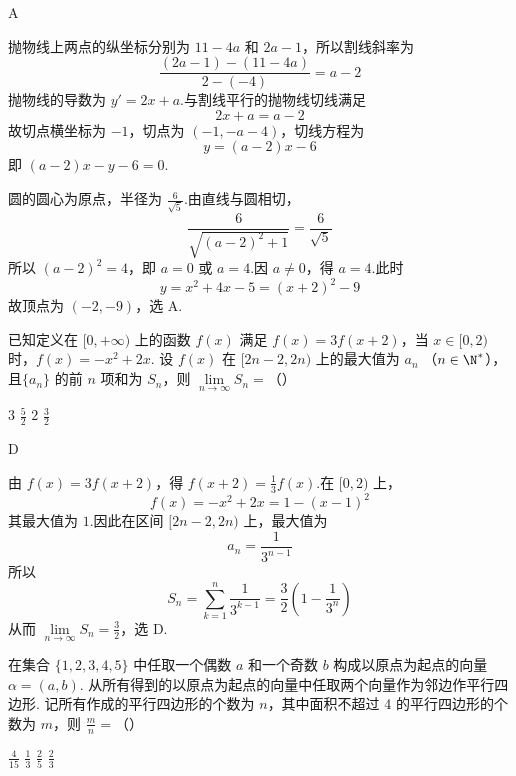 \begin{answer}
A
\end{answer}

\begin{solution}
抛物线上两点的纵坐标分别为 \(11-4a\) 和 \(2a-1\)，所以割线斜率为
\[
\frac{(2a-1)-(11-4a)}{2-(-4)}=a-2
\]
抛物线的导数为 \(y'=2x+a\).与割线平行的抛物线切线满足
\[
2x+a=a-2
\]
故切点横坐标为 \(-1\)，切点为 \((-1,-a-4)\)，切线方程为
\[
y=(a-2)x-6
\]
即 \((a-2)x-y-6=0\).

圆的圆心为原点，半径为 \(\frac{6}{\sqrt5}\).由直线与圆相切，
\[
\frac{6}{\sqrt{(a-2)^2+1}}=\frac{6}{\sqrt5}
\]
所以 \((a-2)^2=4\)，即 \(a=0\) 或 \(a=4\).因 \(a\neq0\)，得 \(a=4\).此时
\[
y=x^2+4x-5=(x+2)^2-9
\]
故顶点为 \((-2,-9)\)，选 A.
\end{solution}

\begin{problem}
已知定义在 \( [0, +\infty) \) 上的函数 \( f(x) \) 满足 \( f(x) = 3f(x + 2) \)，当 \( x \in [0, 2) \) 时，\( f(x) = -x^{2} + 2x \). 设 \( f(x) \) 在 \( [2n - 2, 2n) \) 上的最大值为 \( a_{n} \) （\( n \in \N^{*} \)），且\(\{a_{n}\}\) 的前 \(n\) 项和为 \(S_{n}\)，则 \(\lim\limits_{n\to\infty} S_{n} =\)（\quad）

\choices
    {\(3\)}
    {\(\frac{5}{2}\)}
    {\(2\)}
    {\(\frac{3}{2}\)}
\end{problem}

\begin{answer}
D
\end{answer}

\begin{solution}
由 \(f(x)=3f(x+2)\)，得 \(f(x+2)=\frac13f(x)\).在 \([0,2)\) 上，
\[
f(x)=-x^2+2x=1-(x-1)^2
\]
其最大值为 \(1\).因此在区间 \([2n-2,2n)\) 上，最大值为
\[
a_n=\frac{1}{3^{n-1}}
\]
所以
\[
S_n=\sum_{k=1}^{n}\frac{1}{3^{k-1}}=\frac{3}{2}\left(1-\frac{1}{3^n}\right)
\]
从而 \(\lim\limits_{n\to\infty}S_n=\frac32\)，选 D.
\end{solution}

\begin{problem}
在集合 \(\{1, 2, 3, 4, 5\}\) 中任取一个偶数 \(a\) 和一个奇数 \(b\) 构成以原点为起点的向量 \(\alpha = (a,b)\). 从所有得到的以原点为起点的向量中任取两个向量作为邻边作平行四边形. 记所有作成的平行四边形的个数为 \(n\)，其中面积不超过 4 的平行四边形的个数为 \(m\)，则 \(\frac{m}{n}=\)（\quad）

\choices
    {\(\frac{4}{15}\)}
    {\(\frac{1}{3}\)}
    {\(\frac{2}{5}\)}
    {\(\frac{2}{3}\)}
\end{problem}

